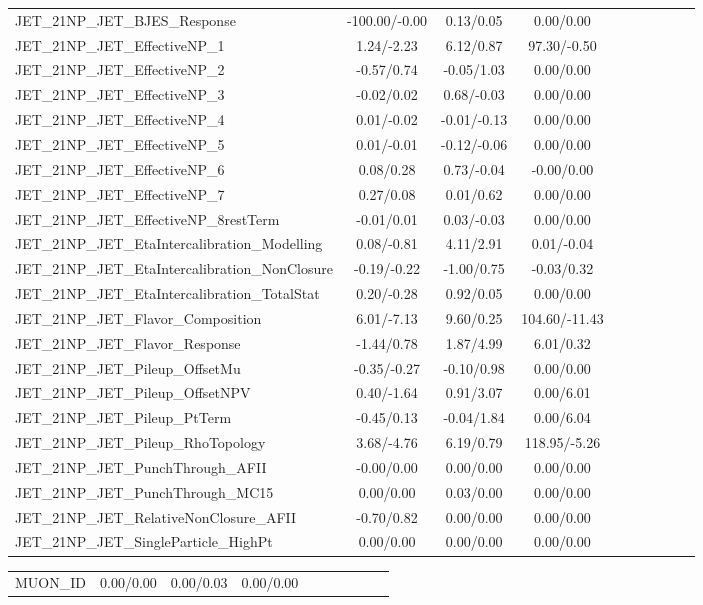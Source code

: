 \begin{table}[h]
\begin{center}
\begin{tabular}{l|ccccccccc}
JET\_21NP\_JET\_BJES\_Response &-100.00/-0.00 &0.13/0.05 &0.00/0.00 \\
JET\_21NP\_JET\_EffectiveNP\_1 &1.24/-2.23 &6.12/0.87 &97.30/-0.50 \\
JET\_21NP\_JET\_EffectiveNP\_2 &-0.57/0.74 &-0.05/1.03 &0.00/0.00 \\
JET\_21NP\_JET\_EffectiveNP\_3 &-0.02/0.02 &0.68/-0.03 &0.00/0.00 \\
JET\_21NP\_JET\_EffectiveNP\_4 &0.01/-0.02 &-0.01/-0.13 &0.00/0.00 \\
JET\_21NP\_JET\_EffectiveNP\_5 &0.01/-0.01 &-0.12/-0.06 &0.00/0.00 \\
JET\_21NP\_JET\_EffectiveNP\_6 &0.08/0.28 &0.73/-0.04 &-0.00/0.00 \\
JET\_21NP\_JET\_EffectiveNP\_7 &0.27/0.08 &0.01/0.62 &0.00/0.00 \\
JET\_21NP\_JET\_EffectiveNP\_8restTerm &-0.01/0.01 &0.03/-0.03 &0.00/0.00 \\
JET\_21NP\_JET\_EtaIntercalibration\_Modelling &0.08/-0.81 &4.11/2.91 &0.01/-0.04 \\
JET\_21NP\_JET\_EtaIntercalibration\_NonClosure &-0.19/-0.22 &-1.00/0.75 &-0.03/0.32 \\
JET\_21NP\_JET\_EtaIntercalibration\_TotalStat &0.20/-0.28 &0.92/0.05 &0.00/0.00 \\
JET\_21NP\_JET\_Flavor\_Composition &6.01/-7.13 &9.60/0.25 &104.60/-11.43 \\
JET\_21NP\_JET\_Flavor\_Response &-1.44/0.78 &1.87/4.99 &6.01/0.32 \\
JET\_21NP\_JET\_Pileup\_OffsetMu &-0.35/-0.27 &-0.10/0.98 &0.00/0.00 \\
JET\_21NP\_JET\_Pileup\_OffsetNPV &0.40/-1.64 &0.91/3.07 &0.00/6.01 \\
JET\_21NP\_JET\_Pileup\_PtTerm &-0.45/0.13 &-0.04/1.84 &0.00/6.04 \\
JET\_21NP\_JET\_Pileup\_RhoTopology &3.68/-4.76 &6.19/0.79 &118.95/-5.26 \\
JET\_21NP\_JET\_PunchThrough\_AFII &-0.00/0.00 &0.00/0.00 &0.00/0.00 \\
JET\_21NP\_JET\_PunchThrough\_MC15 &0.00/0.00 &0.03/0.00 &0.00/0.00 \\
JET\_21NP\_JET\_RelativeNonClosure\_AFII &-0.70/0.82 &0.00/0.00 &0.00/0.00 \\
JET\_21NP\_JET\_SingleParticle\_HighPt &0.00/0.00 &0.00/0.00 &0.00/0.00 \\
\hline \end{tabular} \end{center} \end{table} \begin{table}[h] \scriptsize \begin{center} \begin{tabular}{l|ccccccccc} \hline MUON\_ID &0.00/0.00 &0.00/0.03 &0.00/0.00 \\

\end{tabular}
\end{center}
\end{table}
